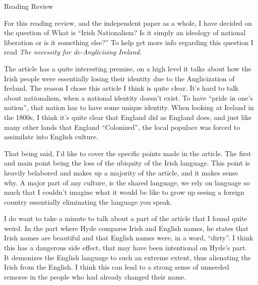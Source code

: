 \documentclass[12pt]{article}
\begin{document}
\vspace*{20pt}
    \begin{center}
    \large{Reading Review}
    \end{center}
    \smallskip
% 
    \par For this reading review, and the independent paper as a whole, I have decided on the question of  What is ``Irish Nationalism? Is it simply an ideology of national liberation or is it something else?''
    To help get more info regarding this question I read \textit{The necessity for de-Anglicising Ireland}.
    \par The article has a quite interesting premise, on a high level it talks about how the Irish people were essentially losing their identity due to the Anglicization of Ireland.
    The reason I chose this article I think is quite clear. It's hard to talk about nationalism, when a national identity doesn't exist. To have ``pride in one's nation'', that nation has to have some unique identity.
    When looking at Ireland in the 1800s, I think it's quite clear that England did as England does, and just like many other lands that England ``Colonized'', the local populace was forced to assimilate into English culture.
    \par That being said, I'd like to cover the specific points made in the article. The first and main point being the loss of the ubiquity of the Irish language.
    This point is heavily belabored and makes up a majority of the article, and it makes sense why. A major part of any culture, is the shared language, we rely on language so much that I couldn't imagine what it would be like to grow up seeing a foreign country essentially eliminating the language you speak.
    \par I do want to take a minute to talk about a part of the article that I found quite weird. In the part where Hyde compares Irish and English names, he states that Irish names are beautiful and that English names were, in a word, ``dirty''.
    I think this has a dangerous side effect, that may have been intentional on Hyde's part. It demonizes the English language to such an extreme extent, thus alienating the Irish from the English. I think this can lead to a strong sense of unneeded remorse in the people who had already changed their name.
\end{document}
